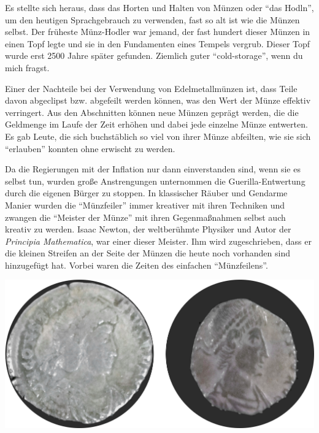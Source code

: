 Es stellte sich heraus, dass das Horten und Halten von Münzen oder “das Hodln”,
um den heutigen Sprachgebrauch zu verwenden, fast so alt ist wie die Münzen
selbst. Der früheste Münz-Hodler war jemand, der fast hundert dieser Münzen in
einen Topf legte und sie in den Fundamenten eines Tempels vergrub. Dieser Topf
wurde erst 2500 Jahre später gefunden. Ziemlich guter \enquote{cold-storage},
wenn du mich fragst.

Einer der Nachteile bei der Verwendung von Edelmetallmünzen ist, dass Teile
davon abgeclipst bzw. abgefeilt werden können, was den Wert der Münze effektiv
verringert. Aus den Abschnitten können neue Münzen geprägt werden, die die
Geldmenge im Laufe der Zeit erhöhen und dabei jede einzelne Münze entwerten. Es
gab Leute, die sich buchstäblich so viel von ihrer Münze abfeilten, wie sie sich
\enquote{erlauben} konnten ohne erwischt zu werden.

Da die Regierungen mit der Inflation nur dann einverstanden sind, wenn sie es
selbst tun, wurden große Anstrengungen unternommen die Guerilla-Entwertung durch
die eigenen Bürger zu stoppen. In klassischer Räuber und Gendarme Manier
wurden die \enquote{Münzfeiler} immer kreativer mit ihren Techniken und zwangen
die \enquote{Meister der Münze} mit ihren Gegenmaßnahmen selbst auch kreativ zu
werden. Isaac Newton, der weltberühmte Physiker und Autor der \textit{Principia
Mathematica}, war einer dieser Meister. Ihm wird zugeschrieben, dass er die
kleinen Streifen an der Seite der Münzen die heute noch vorhanden sind
hinzugefügt hat. Vorbei waren die Zeiten des einfachen \enquote{Münzfeilens}.

\begin{center}
  \includegraphics[width=\textwidth]{assets/images/clipped-coins.png}
  \label{fig:clipped-coins}
\end{center}

